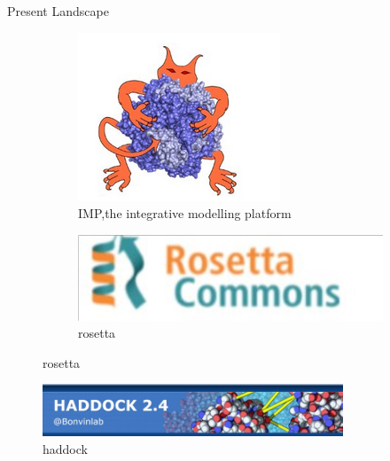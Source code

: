 \begin{frame}{Present Landscape}
    \begin{figure}[h]
        \centering
        \begin{subfigure}[b]{0.3\textwidth}
            \centering
            \includegraphics[width=\textwidth]{images/monster.png}
            \caption{IMP,the integrative modelling platform}
            \label{fig:image1}
        \end{subfigure}
        \hfill
        \begin{subfigure}[b]{0.3\textwidth}
            \centering
            \includegraphics[width=\textwidth]{images/rosseta.png}
            \caption{rosetta}
            \label{fig:image2}
        \end{subfigure}
    \end{figure}

    \begin{figure}
        \centering
        \includegraphics[width=0.8\textwidth]{images/haddock.png}
        \caption{haddock}
        \label{fig:my_label}
    \end{figure}
\end{frame}

